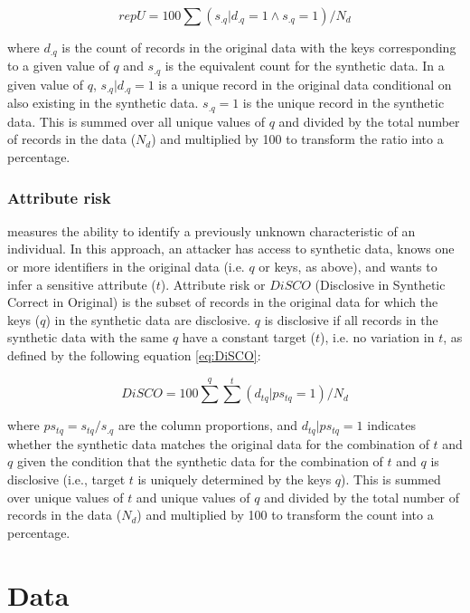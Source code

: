 \documentclass[a4paper,11pt]{style/uneceart}
\begin{document}
\begin{equation}
repU = 100 \sum (s_{.q}|d_{.q} = 1 \land s_{.q} = 1 )/N_{d}
\label{eq:repU}
\end{equation}

where $d_{.q}$ is the count of records in the original data with the keys corresponding to a given value of $q$ and $s_{.q}$ is the equivalent count for the synthetic data.  In a given value of $q$, $s_{.q}|d_{.q} = 1$ is a unique record in the original data conditional on also existing in the synthetic data.  $s_{.q} = 1$ is the unique record in the synthetic data.  This is summed over all unique values of $q$ and divided by the total number of records in the data ($N_{d}$) and multiplied by 100 to transform the ratio into a percentage.

\subsubsection{Attribute risk} measures the ability to identify a previously unknown characteristic of an individual.  In this approach, an attacker has access to synthetic data, knows one or more identifiers in the original data (i.e. $q$ or keys, as above), and wants to infer a sensitive attribute ($t$).  Attribute risk or $DiSCO$ (Disclosive in Synthetic Correct in Original) is the subset of records in the original data for which the keys ($q$) in the synthetic data are disclosive. $q$ is disclosive if all records in the synthetic data with the same $q$ have a constant target ($t$), i.e. no variation in $t$, as defined by the following equation \ref{eq:DiSCO}:

\begin{equation}
DiSCO = 100 \sum^{q} \sum^{t} (d_{tq} | ps_{tq} = 1) / N_{d}
\label{eq:DiSCO}
\end{equation}

where $ps_{tq} = s_{tq}/s_{.q}$ are the column proportions, and $d_{tq} | ps_{tq} = 1$ indicates whether the synthetic data matches the original data for the combination of $t$ and $q$ given the condition that the synthetic data for the combination of $t$ and $q$ is disclosive (i.e., target $t$ is uniquely determined by the keys $q$).  This is summed over unique values of $t$ and unique values of $q$ and divided by the total number of records in the data ($N_{d}$) and multiplied by 100 to transform the count into a percentage.

\section{Data}
\end{document}
